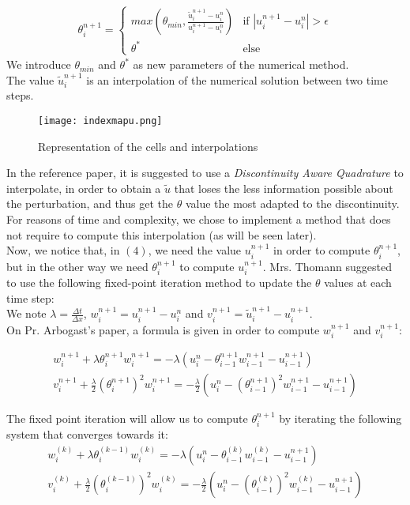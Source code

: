 \documentclass[12pt]{article}
\begin{document}
\begin{align*}
    \theta_i^{n+1} = \begin{cases}
        max(\theta_{min}, \frac{\tilde{u}_i^{n+1} - u_i^n}{u_i^{n+1} - u_i^n} ) & \text{if } |u_i^{n+1} - u_i^n| > \epsilon \tag{4} \\
        \theta^* & \text{else} 
    \end{cases}
\end{align*}
We introduce $\theta_{min}$ and $\theta^*$ as new parameters of the numerical method.\\
The value $\tilde{u}_i^{n+1}$ is an interpolation of the numerical solution between two time steps.\\
\begin{figure}[H]
    \centering
    \texttt{[image: indexmapu.png]}
    \caption{Representation of the cells and interpolations}
\end{figure}
In the reference paper, it is suggested to use a \textit{Discontinuity Aware Quadrature} to interpolate, in order to obtain a $\tilde{u}$
that loses the less information possible about the perturbation, and thus get the $\theta$ value the most adapted to the discontinuity.
For reasons of time and complexity, we chose to implement a method that does not require to compute this interpolation (as will be seen later).\\

Now, we notice that, in $(4)$, we need the value $u_i^{n+1}$ in order to compute $\theta_i^{n+1}$,
but in the other way we need $\theta_i^{n+1}$ to compute $u_i^{n+1}$.
Mrs. Thomann suggested to use the following fixed-point iteration method to update the $\theta$ values at each time step:\\
We note $\lambda = \frac{\Delta t}{\Delta x}$, $w_i^{n+1} = u_i^{n+1} - u_i^{n}$ and $v_i^{n+1} = \tilde{u}_i^{n+1} - u_i^{n+1}$.\\
On Pr. Arbogast's paper, a formula is given in order to compute $w_i^{n+1}$ and $v_i^{n+1}$:

\begin{align*}
    w_i^{n+1} + \lambda \theta_i^{n+1} w_i^{n+1} = -\lambda(u_i^n - \theta_{i-1}^{n+1} w_{i-1}^{n+1} - u_{i-1}^{n+1}) \tag{5a}\\
    v_i^{n+1} + \frac{\lambda}{2} (\theta_i^{n+1})^2 w_i^{n+1} = -\frac{\lambda}{2} (u_i^n - (\theta_{i-1}^{n+1})^2 w_{i-1}^{n+1} - u_{i-1}^{n+1}) \tag{5b}
\end{align*}

The fixed point iteration will allow us to compute $\theta_i^{n+1}$ by iterating the following system that converges towards it:
\begin{align*}
    w_i^{(k)} + \lambda \theta_i^{(k-1)} w_i^{(k)} = -\lambda(u_i^n - \theta_{i-1}^{(k)} w_{i-1}^{(k)} - u_{i-1}^{n+1}) \tag{6a}\\
    v_i^{(k)} + \frac{\lambda}{2} (\theta_i^{(k-1)})^2 w_i^{(k)} = -\frac{\lambda}{2} (u_i^n - (\theta_{i-1}^{(k)})^2 w_{i-1}^{(k)} - u_{i-1}^{n+1}) \tag{6b}
\end{align*}
\end{document}
